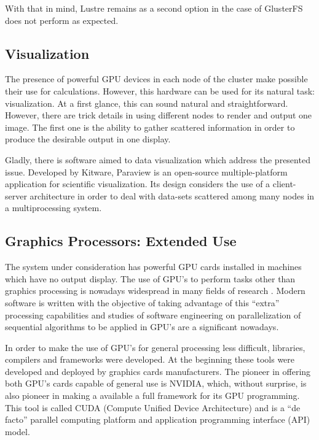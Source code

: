 \documentclass[twoside,a4paper,12pt,english]{inac17}
\begin{document}
With that in mind, Lustre remains as a second option in the case of GlusterFS does not perform as expected. 


\subsection{Visualization}

The presence of powerful GPU devices in each node of the cluster make possible their use for calculations. However,
this hardware can be used for its natural task: visualization. At a first glance, this can sound natural and
straightforward. However, there are trick details in using different nodes to render and output one image. The first one
is the ability to gather scattered information in order to produce the desirable output in one display.

Gladly, there is software aimed to data visualization which address the presented issue. Developed by Kitware\cite{kitware},
Paraview\cite{paraview} is an open-source multiple-platform application for scientific visualization. Its design considers
the use of a client-server architecture in order to deal with data-sets scattered among many nodes in a multiprocessing
system. 


\subsection{Graphics Processors: Extended Use}

The system under consideration has powerful GPU cards installed in machines
which have no output display. The use of GPU's to perform tasks other than graphics processing
is nowadays widespread in many fields of research \cite{UsoDeGpus}. Modern software is written with
the objective of taking advantage of this ``extra'' processing capabilities and studies of software
engineering on parallelization of sequential algorithms to be applied in GPU's are a significant
nowadays.

In order to make the use of GPU's for general processing less difficult, libraries, compilers and
frameworks were developed. At the beginning these tools were developed and deployed by graphics cards
manufacturers. The pioneer in offering both GPU's cards capable of general use is NVIDIA, which,
without surprise, is also pioneer in making a available a full framework for its GPU programming.
This tool is called CUDA (Compute Unified Device Architecture) and is a ``de facto'' parallel computing platform
and application programming interface (API) model.
\end{document}
